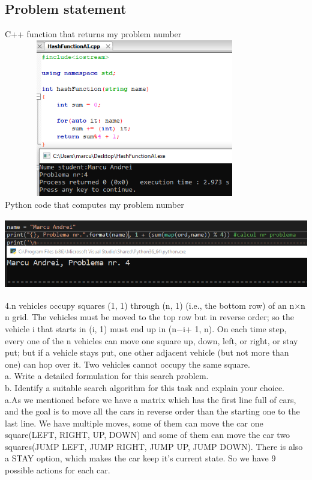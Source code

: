 \documentclass[14pt]{article}
\begin{document}
\begin{center}
\section*{Problem statement}
\vspace{20 mm}
C++ function that returns my problem number\\
\includegraphics[height=2.7in, width = 4.5in]{problemanr41.png}\\
Python code that computes my problem number\\
\includegraphics[height=1.5in, width = 6in]{problemanr42.png}\\
\vspace{20 mm}
4.n vehicles occupy squares (1, 1) through (n, 1) (i.e., the bottom row) of
an n×n n grid. The vehicles must be moved to the top row but in reverse
order; so the vehicle i that starts in (i, 1) must end up in (n−i+ 1, n). On each time step, every one of the n vehicles can move one square up, down,
left, or right, or stay put; but if a vehicle stays put, one other adjacent
vehicle (but not more than one) can hop over it. Two vehicles cannot
occupy the same square.
\vspace{5mm}
\\a. Write a detailed formulation for this search problem.
\\b. Identify a suitable search algorithm for this task and explain your
choice.
\\\vspace{10 mm}
a.As we mentioned before we have a matrix which has the first line full of cars, and the goal is to move all the cars in reverse order than the starting one to the last line. We have multiple moves, some of them can move the car one square(LEFT, RIGHT, UP, DOWN) and some of them can move the car two squares(JUMP LEFT, JUMP RIGHT, JUMP UP, JUMP DOWN). There is also a STAY option, which makes the car keep it's current state. So we have 9 possible actions for each car.

\end{center}
\end{document}
